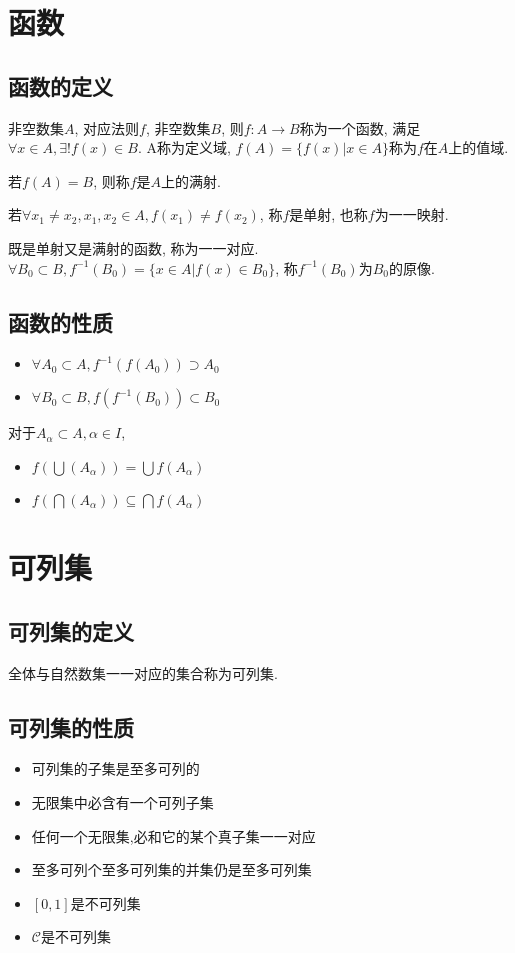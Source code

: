 \section{函数}
\subsection{函数的定义}
非空数集$A$, 对应法则$f$, 非空数集$B$, 则$f:A \rightarrow B$称为一个函数, 满足$\forall x \in A, \exists !f(x) \in B$. A称为定义域, $f(A)=\{f(x)|x \in A\}$称为$f$在$A$上的值域. \par
若$f(A)=B$, 则称$f$是$A$上的满射. \par
若$\forall x_1 \neq x_2, x_1, x_2 \in A, f(x_1) \neq f(x_2)$, 称$f$是单射, 也称$f$为一一映射. \par
既是单射又是满射的函数, 称为一一对应. 
$\forall B_0 \subset B, f^{-1}(B_0)=\{x \in A | f(x) \in B_0\}$, 称$f^{-1}(B_0)$为$B_0$的原像. \par
\subsection{函数的性质}
\begin{itemize}
    \item $\forall A_0 \subset A, f^{-1}(f(A_0)) \supset A_0$
    \item $\forall B_0 \subset B, f(f^{-1}(B_0)) \subset B_0$
\end{itemize}
\par
对于$A_\alpha \subset A, \alpha \in I$, 
\begin{itemize} 
    \item $f(\bigcup (A_\alpha)) = \bigcup f(A_\alpha)$ 
    \item $f(\bigcap (A_\alpha)) \subseteq \bigcap f(A_\alpha)$ 
\end{itemize}
\section{可列集}
\subsection{可列集的定义}
全体与自然数集一一对应的集合称为可列集. 
\subsection{可列集的性质}
\begin{itemize}
    \item 可列集的子集是至多可列的
    \item 无限集中必含有一个可列子集
    \item 任何一个无限集,必和它的某个真子集一一对应
    \item 至多可列个至多可列集的并集仍是至多可列集
    \item $\left[0, 1\right]$是不可列集
    \item $\mathscr{C}$是不可列集
\end{itemize}
